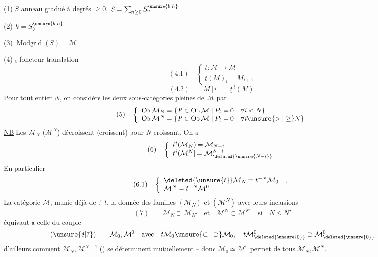 (1) $S$ anneau gradué  \uline{à degrés $\geq0$}, $S=\sum_{n\geq0}S_n^{\unsure{b|h}}$


(2) $k=S_0^{\unsure{b|h}}$

(3) $\operatorname{Modgr.d}(S)=\mathcal M$

(4) $\underline t$ foncteur translation
\[
(4.1)\quad\left\{\begin{array}{l}
\underline t:\mathcal M\longrightarrow\mathcal M\\
\underline t(M)_i=M_{i+1}
\end{array}\right.
\]
\[
(4.2)\qquad M[i]=\underline t^{\,i}(M).
\]
Pour tout entier $N$, on considère les deux sous-catégories  pleines  de $\mathcal M$  par
\[
(5)\quad\left\{\begin{array}{l}
\operatorname{Ob}\mathcal M_N=\{P\in\operatorname{Ob}\mathcal M\mid P_i=0\quad\forall i<N\}\\
\operatorname{Ob}\mathcal M^N=\{P\in\operatorname{Ob}\mathcal M\mid P_i=0\quad\forall i\unsure{>|\geq}N\}
\end{array}\right.
\]
\uline{NB} Les $\mathcal M_N$ ($\mathcal M^N$) décroissent (croissent) pour $N$ croissant. On a
\[
(6)\quad\left\{\begin{array}{l}
t^i(\mathcal M_N)=\mathcal M_{N-i}\\
t^i(\mathcal M^N]=\mathcal M^{N-i}_{\deleted{\unsure{N-i}}}
\end{array}\right.
\]
En particulier 
\[
(6.1)\quad\left\{\begin{array}{l}
\deleted{\unsure{t}}\mathcal M_N=t^{-N}\mathcal M_0\quad,\\
\mathcal M^N=t^{-N}\mathcal M^0
\end{array}\right.
\]
 La catégorie $\mathcal M$, munie déjà de l' $t$, la donnée des familles $(\mathcal M_N)$ et $(\mathcal M^N)$ avec leurs inclusions 
\[
(7)\qquad\mathcal M_N\supset\mathcal M_{N'}\quad\text{et}\quad\mathcal M^N\subset\mathcal M^{N'}\quad\text{si}\quad N\leq N'
\]
équivaut à celle  du couple
\[
(\unsure{8|7})\qquad\mathcal M_0,\mathcal M^0\quad\text{avec}\quad t\mathcal M_0\unsure{\subset|\supset}\mathcal M_0,\quad
 t\mathcal M^0_{\deleted{\unsure{0}}}\supset\mathcal M^0_{\deleted{\unsure{0}}}
\]
 d'ailleurs comment $\mathcal M_N,\mathcal M^{N-1}$ () se déterminent mutuellement -- donc $\mathcal M_0\simeq\mathcal M^0$ permet de  tous  $\mathcal M_N,\mathcal M^N$.

